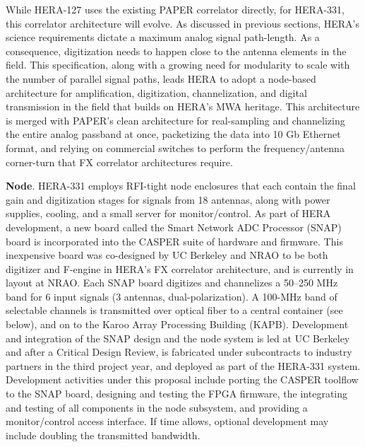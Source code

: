 \documentclass[preprint]{aastex}
\begin{document}
While HERA-127 uses the existing PAPER correlator directly, for
HERA-331, this correlator architecture will evolve.  As discussed in previous sections,
HERA's science requirements dictate a maximum analog signal path-length.  As a consequence,
digitization needs to happen close to the antenna
elements in the field.  This specification, along with a growing need for modularity to scale with the number of parallel signal paths,
leads HERA to adopt a node-based architecture for amplification, digitization, channelization, and digital
transmission in the field that builds on HERA's MWA heritage.  This architecture is merged with PAPER's clean 
architecture for real-sampling and channelizing the entire analog passband at once, packetizing the data into
10 Gb Ethernet format, and relying on commercial switches to perform the frequency/antenna corner-turn that
FX correlator architectures require. 



{\bf Node}. HERA-331 employs RFI-tight node enclosures that each contain the final gain and digitization stages for
signals from 18 antennas, along with power supplies, cooling, and a small server for monitor/control.  
As part of HERA development,
a new board called the Smart Network ADC Processor (SNAP) board is incorporated 
into the CASPER suite of hardware and firmware. This inexpensive board was co-designed by UC Berkeley and NRAO to be
both digitizer and F-engine in HERA's FX correlator architecture,
and is currently in layout at NRAO.  Each SNAP board 
digitizes and channelizes a 50--250 MHz band for 6 input signals (3 antennas, dual-polarization).
A 100-MHz band of selectable channels is transmitted over optical fiber
to a central container (see below), and on to the Karoo Array Processing Building (KAPB).  Development and integration of the SNAP
design and the node system is led at UC Berkeley and after a Critical Design Review, is fabricated
under subcontracts to industry partners in the third project year, and deployed as part of the HERA-331 system.
Development activities under this proposal include porting the CASPER toolflow to
the SNAP board, designing and testing the FPGA firmware,
the integrating and testing of all components in the node subsystem, and providing a monitor/control
access interface.  If time allows, optional development may include doubling the transmitted bandwidth.
\end{document}
